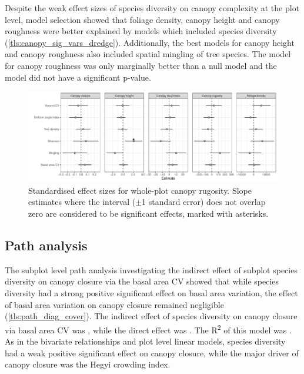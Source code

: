 \begin{refsection}
Despite the weak effect sizes of species diversity on canopy complexity at the plot level, model selection showed that foliage density, canopy height and canopy roughness were better explained by models which included species diversity (\autoref{tls:canopy_sig_vars_dredge}). Additionally, the best models for canopy height and canopy roughness also included spatial mingling of tree species. The model for canopy roughness was only marginally better than a null model and the model did not have a significant p-value.

\begin{figure}
	\includegraphics[width=\linewidth]{img/canopy_rough_slopes}
	\caption[Plot canopy complexity metric fixed effects]{Standardised effect sizes for whole-plot canopy rugosity. Slope estimates where the interval ($\pm$1 standard error) does not overlap zero are considered to be significant effects, marked with asterisks.}
	\label{tls:canopy_rough_slopes}
\end{figure}

\begin{landscape}

\end{landscape}

\subsection{Path analysis}
\label{tls:ssec:path_analysis}

The subplot level path analysis investigating the indirect effect of subplot species diversity on canopy closure via the basal area CV showed that while species diversity had a strong positive significant effect on basal area variation, the effect of basal area variation on canopy closure remained negligible (\autoref{tls:path_diag_cover}). The indirect effect of species diversity on canopy closure via basal area CV was \shannonBaCoverPath{}, while the direct effect was \shannonCoverPath{}. The R\textsuperscript{2} of this model was \coverSemRm{}. As in the bivariate relationships and plot level linear models, species diversity had a weak positive significant effect on canopy closure, while the major driver of canopy closure was the Hegyi crowding index. 


\end{refsection}
